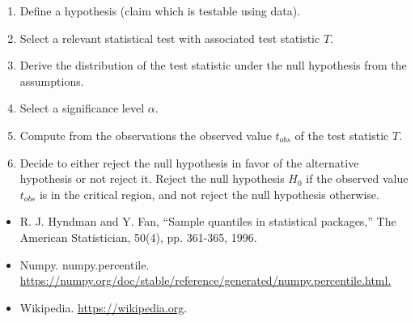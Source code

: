 \documentclass[a4paper,12pt]{report}
\begin{document}
\begin{enumerate}
\item Define a hypothesis (claim which is testable using data).
\item Select a relevant statistical test with associated test statistic $T$.
\item Derive the distribution of the test statistic under the null hypothesis from the assumptions.
\item Select a significance level $\alpha$.
\item Compute from the observations the observed value $t_{obs}$ of the test statistic $T$.
\item Decide to either reject the null hypothesis in favor of the alternative hypothesis or not reject it. Reject the null hypothesis $H_0$ if the observed value $t_{obs}$ is in the critical region, and not reject the null hypothesis otherwise.
\end{enumerate}
\begin{itemize}
\item R. J. Hyndman and Y. Fan, “Sample quantiles in statistical packages,” The American Statistician, 50(4), pp. 361-365, 1996.
\item Numpy. numpy.percentile. \href{https://numpy.org/doc/stable/reference/generated/numpy.percentile.html.}{https://numpy.org/doc/stable/reference/generated/numpy.percentile.html.}
\item Wikipedia. \href{https://wikipedia.org}{https://wikipedia.org}.
\end{itemize}
\end{document}
